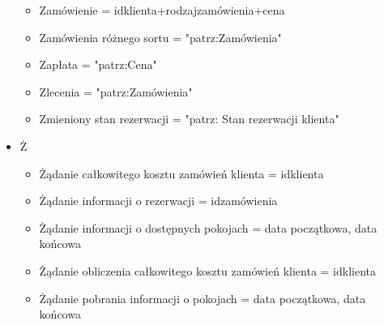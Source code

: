 \documentclass[a4paper, 11pt]{article}
\begin{document}
\begin{itemize}
\begin{itemize}
			\item Zamówienie = idklienta+rodzajzamówienia+cena
			\item Zamówienia różnego sortu = "patrz:Zamówienia"
			\item Zapłata = "patrz:Cena"
			\item Zlecenia = "patrz:Zamówienia"
			\item Zmieniony stan rezerwacji = "patrz: Stan rezerwacji klienta"
		\end{itemize}
		\item Ż
		\begin{itemize}
			\item Żądanie całkowitego kosztu zamówień klienta = idklienta
			\item Żądanie informacji o rezerwacji = idzamówienia
			\item Żądanie  informacji o dostępnych pokojach = data początkowa, data końcowa
			\item Żądanie obliczenia całkowitego kosztu zamówień klienta = idklienta
			\item Żądanie pobrania informacji o pokojach = data początkowa, data końcowa
		\end{itemize}
		
	\end{itemize}
	
	
	
	
	
		
\end{document}
